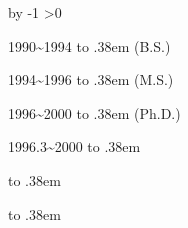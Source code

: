 \documentclass[master,english,final]{postech-ucs}
\newcommand{\samplelines}[2][19.6bp]{%
  \par\begingroup
  \setlength{\baselineskip}{#1}%
  \samplerows=#2\relax
  \loop
    \noindent\makebox[\linewidth][c]{\rule{.92\linewidth}{.55bp}}\par
    \advance\samplerows by -1
  \ifnum\samplerows>0
  \repeat
  \endgroup}
\newcommand{\cvdots}{\leavevmode\nobreak\leaders\hbox to .38em{\hss\textperiodcentered\hss}\hfill\kern0pt}
\begin{document}
\acknowledgement[english]
\samplelines[36.4bp]{6}

\curriculumvitae[english]
\begin{personaldata}
  \name{}
\end{personaldata}
\begin{education}
  \item 1990\textasciitilde1994 \cvdots{} (B.S.)
  \item 1994\textasciitilde1996 \cvdots{} (M.S.)
  \item 1996\textasciitilde2000 \cvdots{} (Ph.D.)
\end{education}
\begin{experience}
  \item 1996.3\textasciitilde2000 \cvdots{}
\end{experience}
\begin{affiliation}
  \item \cvdots{}
  \item \cvdots{}
\end{affiliation}

\thesiscopyright
\label{paperlastpagelabel}
\thesisbackmatter
\end{document}
